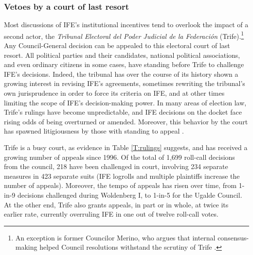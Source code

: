 \documentclass[12 pt, letter]{article}
\begin{document}
\subsubsection{Vetoes by a court of last resort}
Most discussions of IFE's institutional incentives tend to overlook the impact of a second actor, the \emph{Tribunal Electoral del Poder Judicial de la Federaci\'on} ({\sc Trife}).\footnote{An exception is former Councilor Merino, who argues that internal consensus-making helped Council resolutions withstand the scrutiny of {\sc Trife} \citep{Merino1999}.}  Any Council-General decision can be appealed to this electoral court of last resort.  All political parties and their candidates, national political associations, and even ordinary citizens in some cases, have standing before {\sc Trife} to challenge IFE's decisions.  Indeed, the tribunal has over the course of its history shown a growing interest in revising IFE's agreements, sometimes rewriting the tribunal's own jurisprudence in order to force its criteria on IFE, and at other times limiting the scope of IFE's decision-making power.  In many areas of election law, {\sc Trife}'s rulings have become unpredictable, and IFE decisions on the docket face rising odds of being overturned or amended.  Moreover, this behavior by the court has spawned litigiousness by those with standing to appeal \citep{Eisenstadt2004}.


{\sc Trife} is a busy court, as evidence in Table \ref{T:rulings} suggests, and has received a growing number of appeals since 1996.  Of the total of 1,699 roll-call decisions from the council, 218 have been challenged in court, involving 234 separate measures in 423 separate suits (IFE logrolls and multiple plaintiffs increase the number of appeals).  Moreover, the tempo of appeals has risen over time, from 1-in-9 decisions challenged during Woldenberg I, to 1-in-5 for the Ugalde Council.  At the other end, {\sc Trife} also grants appeals, in part or in whole, at twice its earlier rate, currently overruling IFE in one out of twelve roll-call votes.
\end{document}
